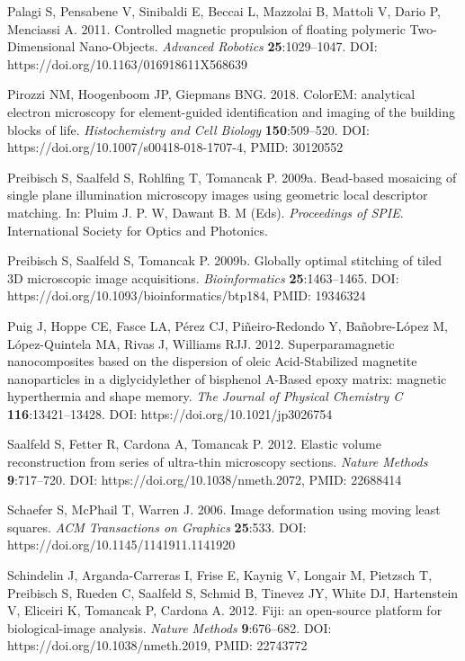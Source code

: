 \documentclass{article}
\newenvironment{reflist}{\par\small\setlength{\parindent}{0pt}\everypar{\hangindent=2.2em\hangafter=1}}{\par}
\begin{document}
\begin{reflist}
Palagi S, Pensabene V, Sinibaldi E, Beccai L, Mazzolai B, Mattoli V, Dario P, Menciassi A. 2011. Controlled magnetic propulsion of floating polymeric Two-Dimensional Nano-Objects. \emph{Advanced Robotics} \textbf{25}:1029–1047. DOI: https://doi.org/10.1163/016918611X568639

Pirozzi NM, Hoogenboom JP, Giepmans BNG. 2018. ColorEM: analytical electron microscopy for element-guided identification and imaging of the building blocks of life. \emph{Histochemistry and Cell Biology} \textbf{150}:509–520. DOI: https://doi.org/10.1007/s00418-018-1707-4, PMID: 30120552

Preibisch S, Saalfeld S, Rohlfing T, Tomancak P. 2009a. Bead-based mosaicing of single plane illumination microscopy images using geometric local descriptor matching. In: Pluim J. P. W, Dawant B. M (Eds). \emph{Proceedings of SPIE}. International Society for Optics and Photonics.

Preibisch S, Saalfeld S, Tomancak P. 2009b. Globally optimal stitching of tiled 3D microscopic image acquisitions. \emph{Bioinformatics} \textbf{25}:1463–1465. DOI: https://doi.org/10.1093/bioinformatics/btp184, PMID: 19346324

Puig J, Hoppe CE, Fasce LA, Pérez CJ, Piñeiro-Redondo Y, Bañobre-López M, López-Quintela MA, Rivas J, Williams RJJ. 2012. Superparamagnetic nanocomposites based on the dispersion of oleic Acid-Stabilized magnetite nanoparticles in a diglycidylether of bisphenol A-Based epoxy matrix: magnetic hyperthermia and shape memory. \emph{The Journal of Physical Chemistry C} \textbf{116}:13421–13428. DOI: https://doi.org/10.1021/jp3026754

Saalfeld S, Fetter R, Cardona A, Tomancak P. 2012. Elastic volume reconstruction from series of ultra-thin microscopy sections. \emph{Nature Methods} \textbf{9}:717–720. DOI: https://doi.org/10.1038/nmeth.2072, PMID: 22688414

Schaefer S, McPhail T, Warren J. 2006. Image deformation using moving least squares. \emph{ACM Transactions on Graphics} \textbf{25}:533. DOI: https://doi.org/10.1145/1141911.1141920

Schindelin J, Arganda-Carreras I, Frise E, Kaynig V, Longair M, Pietzsch T, Preibisch S, Rueden C, Saalfeld S, Schmid B, Tinevez JY, White DJ, Hartenstein V, Eliceiri K, Tomancak P, Cardona A. 2012. Fiji: an open-source platform for biological-image analysis. \emph{Nature Methods} \textbf{9}:676–682. DOI: https://doi.org/10.1038/nmeth.2019, PMID: 22743772


\end{reflist}
\end{document}

